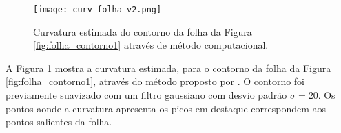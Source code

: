 \begin{figure}[h!]
 \caption{\label{fig:curv_folha} Curvatura estimada do contorno da folha da Figura \ref{fig:folha_contorno1} através de método computacional.}
  \centering
  \texttt{[image: curv\_folha\_v2.png]}
\end{figure}

A Figura \ref{fig:curv_folha} mostra a curvatura estimada, para o contorno da folha da Figura \ref{fig:folha_contorno1}, através do método proposto por . O contorno foi previamente suavizado com um filtro gaussiano com desvio padrão $\sigma = 20$. Os pontos aonde a curvatura apresenta os picos em destaque correspondem aos pontos salientes da folha. 

\begin{comment}
Particularmente, métodos de extração de características multiescala do contorno a partir da curvatura conseguem superar o problema supracitado aplicando filtragens passa-baixa a representação paramétrica do contorno antes de se calcular a curvatura. 
\end{comment}






